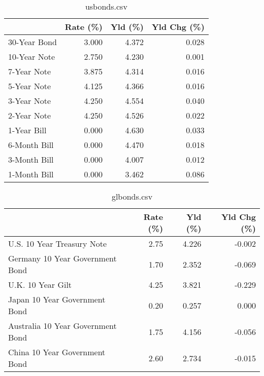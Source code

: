 \documentclass{article}%
\begin{document}
%


\begin{table}[htbp]%
\caption{usbonds.csv}%
\centering%
\begin{adjustbox}{width=1\textwidth}%
\begin{tabular}{lrrr}
\toprule
             &  Rate (\%) &  Yld (\%) &  Yld Chg (\%) \\
\midrule
30-Year Bond &     3.000 &    4.372 &        0.028 \\
10-Year Note &     2.750 &    4.230 &        0.001 \\
 7-Year Note &     3.875 &    4.314 &        0.016 \\
 5-Year Note &     4.125 &    4.366 &        0.016 \\
 3-Year Note &     4.250 &    4.554 &        0.040 \\
 2-Year Note &     4.250 &    4.526 &        0.022 \\
 1-Year Bill &     0.000 &    4.630 &        0.033 \\
6-Month Bill &     0.000 &    4.470 &        0.018 \\
3-Month Bill &     0.000 &    4.007 &        0.012 \\
1-Month Bill &     0.000 &    3.462 &        0.086 \\
\bottomrule
\end{tabular}
%
\end{adjustbox}%
\end{table}

%


\begin{table}[htbp]%
\caption{glbonds.csv}%
\centering%
\begin{adjustbox}{width=1\textwidth}%
\begin{tabular}{lrrr}
\toprule
                                  &  Rate (\%) &  Yld (\%) &  Yld Chg (\%) \\
\midrule
       U.S. 10 Year Treasury Note &      2.75 &    4.226 &       -0.002 \\
  Germany 10 Year Government Bond &      1.70 &    2.352 &       -0.069 \\
                U.K. 10 Year Gilt &      4.25 &    3.821 &       -0.229 \\
    Japan 10 Year Government Bond &      0.20 &    0.257 &        0.000 \\
Australia 10 Year Government Bond &      1.75 &    4.156 &       -0.056 \\
    China 10 Year Government Bond &      2.60 &    2.734 &       -0.015 \\
\bottomrule
\end{tabular}
%
\end{adjustbox}%
\end{table}
\end{document}
